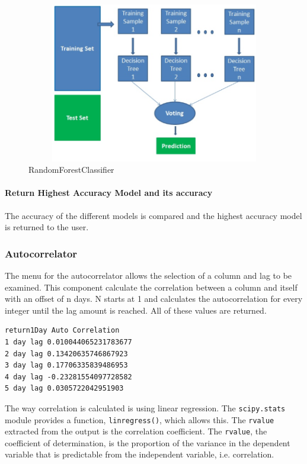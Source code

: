 \begin{itemize}
\begin{figure}[h]
        \centering
        \includegraphics[width=15cm,height=7cm,keepaspectratio]{implementation/randomForest.png}
        \caption{RandomForestClassifier}
        \label{fig:randomForest}
    \end{figure}
\end{itemize}

\paragraph{Return Highest Accuracy Model and its accuracy}

The accuracy of the different models is compared and the highest accuracy model is returned to the user.

\subsubsection{Autocorrelator}

The menu for the autocorrelator allows the selection of a column and lag to be examined. This component calculate the correlation between a column and itself with an offset of n days. N starts at 1 and calculates the autocorrelation for every integer until the lag amount is reached. All of these values are returned.

\begin{lstlisting}[caption=Example AutoCorrelator Output when lag = 5 for return1Day column]
return1Day Auto Correlation
1 day lag 0.010044065231783677
2 day lag 0.13420635746867923
3 day lag 0.17706335839486953
4 day lag -0.23281554097728582
5 day lag 0.0305722042951903
\end{lstlisting}

The way correlation is calculated is using linear regression. The \verb|scipy.stats| module provides a function, \verb|linregress()|, which allows this. The \verb|rvalue| extracted from the output is the correlation coefficient. The \verb|rvalue|, the coefficient of determination, is the proportion of the variance in the dependent variable that is predictable from the independent variable, i.e. correlation.

